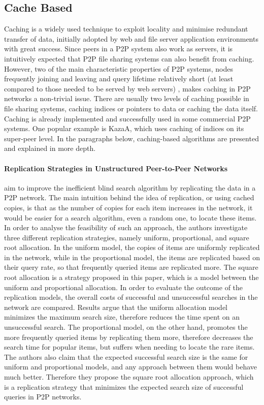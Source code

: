 \documentclass[acmcsur,acmnow]{acmtrans2m}
\begin{document}
\subsection{Cache Based}
Caching is a widely used technique to exploit locality and minimise
redundant transfer of data, initially adopted by web and file server application environments with great success. Since peers in a P2P system also work as servers, it is intuitively expected that P2P file sharing systems can also benefit from caching. However, two of the main characteristic properties of P2P systems, nodes frequently joining and leaving and query lifetime relatively short (at least compared to those needed to be served by web servers) , makes caching in P2P networks a non-trivial issue. There are
usually two levels of caching possible in file sharing systems, caching indices or pointers to data or caching the data itself. Caching is already implemented and successfully used in some commercial P2P systems. One popular example is KazaA, which uses caching of indices on its super-peer level. In the paragraphs below, caching-based algorithms are presented and explained in more depth.

\paragraph*{\bf Replication Strategies in Unstructured Peer-to-Peer Networks}

\cite{Cohen02} aim to improve the inefficient blind search algorithm by
replicating the data in a P2P network. The main intuition behind the
idea of replication, or using cached copies, is that as the number of copies for
each item increases in the network, it would be easier for a search algorithm,
even a random one, to locate these items. In order to analyse the feasibility of
such an approach, the authors investigate three different replication
strategies, namely uniform, proportional, and square root allocation. In the
uniform model, the copies of items are uniformly replicated in the network,
while in the proportional model, the items are replicated based on their query
rate, so that frequently queried items are replicated more. The square root
allocation is a strategy proposed in this paper, which is a model between the
uniform and proportional allocation.  In order to evaluate the outcome of the
replication models, the overall costs of successful and unsuccessful searches in the network are compared. Results argue that the uniform allocation model minimizes the maximum search size, therefore reduces the time spent on an unsuccessful search. The proportional model, on the other hand, promotes the more frequently queried items by replicating them
more, therefore decreases the search time for popular items, but suffers when
needing to locate the rare items. The authors also claim that the expected successful
search size is the same for uniform and proportional models, and any approach
between them would behave much better. Therefore they propose the square root
allocation approach, which is a replication strategy that minimizes the expected
search size of successful queries in P2P networks.
\end{document}
